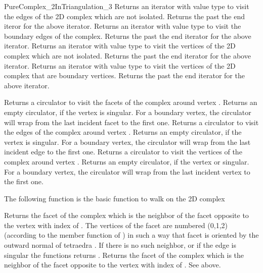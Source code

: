 \begin{ccRefConcept}{PureComplex_2InTriangulation_3}
{Returns an iterator with value type  to visit the
edges of the 2D complex which are not isolated.}
\ccGlue
{}
{Returns the past the end iteror for the above iterator.}
\ccGlue
{}
{Returns an iterator with value type  to visit the
boundary  edges of the complex.}
\ccGlue
{}
{Returns the past the end iterator for the above iterator.}
\ccGlue
{}
{Returns an iterator with value type  to visit the
vertices of the 2D complex which are not isolated.}
\ccGlue
{}
{Returns the past the end iterator for the above iterator.}
\ccGlue
{}
{Returns an iterator with value type  to visit the 
vertices of the 2D complex that are  boundary vertices.}
\ccGlue
{}
{Returns the past the end iterator for the above iterator.}


{Returns a circulator to visit the facets of the complex around
vertex . Returns an empty circulator, if the vertex is 
singular. For a boundary  vertex,  the circulator will wrap from the last
incident facet  to the first one.}
\ccGlue
{}
{Returns a circulator to visit the edges of the complex around
vertex . Returns an empty circulator, if the vertex is 
singular. For a boundary  vertex,  the circulator will wrap from the last
incident edge  to the first one.}
\ccGlue
{}
{Returns a circulator to visit the vertices of the complex around
vertex . Returns an empty circulator, if the vertex  or
singular. For a boundary  vertex,  the circulator will wrap from the last
incident vertex  to the first one.}

The following function is the basic function to walk on the 2D
complex

{Returns the facet of the complex which is the neighbor of 
the facet  opposite to the vertex with index  of
.
The vertices of the facet  are numbered
(0,1,2) (according to the  member function
of )
in such a way that facet  is oriented by the
outward normal of tetraedra . 
If there is no such neighbor, or if the edge is singular the functions returns .}
\ccGlue
{}
{Returns the facet of the complex which is the neighbor of 
the facet  opposite to the vertex with index  of .
See above.}





\end{ccRefConcept}
